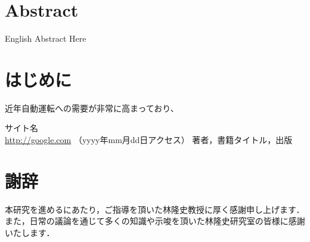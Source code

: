 \documentclass[a4j, 11pt]{jarticle}
\begin{document}
\section*{Abstract}
English Abstract Here


\newpage
\tableofcontents       %
\thispagestyle{empty}  %
\pagebreak
{} %


\section{はじめに}
近年自動運転への需要が非常に高まっており、


\begin{thebibliography}{1}
サイト名\\ \url{http://google.com} （yyyy年mm月dd日アクセス） %
著者，書籍タイトル，出版                                      %
\end{thebibliography}




\newpage
\section*{謝辞}
本研究を進めるにあたり，ご指導を頂いた林隆史教授に厚く感謝申し上げます．
また，日常の議論を通じて多くの知識や示唆を頂いた林隆史研究室の皆様に感謝いたします．
\end{document}
